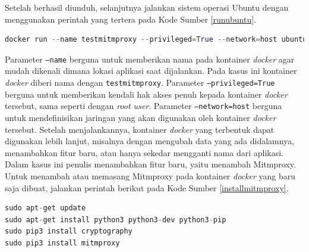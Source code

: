 Setelah berhasil diunduh, selanjutnya jalankan sistem operasi Ubuntu dengan menggunakan perintah yang tertera pada Kode Sumber \ref{runubuntu}.
\newline
\begin{lstlisting}[frame=single,tabsize=2,breaklines,captionpos=b,caption=Perintah untuk Menjalankan \textit{Image} Ubuntu,language=Python,label=runubuntu]
docker run --name testmitmproxy --privileged=True --network=host ubuntu
\end{lstlisting}
Parameter \texttt{--name} berguna untuk memberikan nama pada kontainer \textit{docker} agar mudah dikenali dimana lokasi aplikasi saat dijalankan. Pada kasus ini kontainer \textit{docker} diberi nama dengan \texttt{testmitmproxy}. Parameter \texttt{--privileged=True} berguna untuk memberikan kendali hak akses penuh kepada kontainer \textit{docker} tersebut, sama seperti dengan \textit{root user}. Parameter \texttt{--network=host} berguna untuk mendefinisikan jaringan yang akan digunakan oleh kontainer \textit{docker} tersebut. Setelah menjalankannya, kontainer \textit{docker} yang terbentuk dapat digunakan lebih lanjut, misalnya dengan mengubah data yang ada didalamnya, menambahkan fitur baru, atau hanya sekedar mengganti nama dari aplikasi.\\
\indent Dalam kasus ini penulis menambahkan fitur baru, yaitu menambah Mitmproxy. Untuk menambah atau memasang Mitmproxy pada kontainer \textit{docker} yang baru saja dibuat, jalankan perintah berikut pada Kode Sumber \ref{installmitmproxy}.
\newline
\begin{lstlisting}[frame=single,tabsize=2,breaklines,captionpos=b,caption=Perintah untuk Pemasangan Mitmrproxy,language=Python,label=installmitmproxy]
sudo apt-get update
sudo apt-get install python3 python3-dev python3-pip
sudo pip3 install cryptography
sudo pip3 install mitmproxy
\end{lstlisting}

